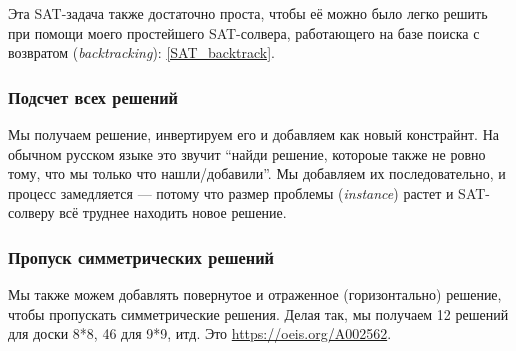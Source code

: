 Эта SAT-задача также достаточно проста, чтобы её можно было легко решить при помощи моего простейшего
SAT-солвера, работающего на базе поиска с возвратом (\textit{backtracking}):
\ref{SAT_backtrack}.

\subsubsection{Подсчет всех решений}

Мы получаем решение, инвертируем его и добавляем как новый констрайнт.
На обычном русском языке это звучит ``найди решение, котороые также не ровно тому, что мы только что нашли/добавили''.
Мы добавляем их последовательно, и процесс замедляется --- потому что размер проблемы (\textit{instance}) растет 
и SAT-солверу всё труднее находить новое решение.

\subsubsection{Пропуск симметрических решений}

Мы также можем добавлять повернутое и отраженное (горизонтально) решение, чтобы пропускать симметрические решения.
Делая так, мы получаем 12 решений для доски 8*8, 46 для 9*9, итд.
Это \url{https://oeis.org/A002562}.

